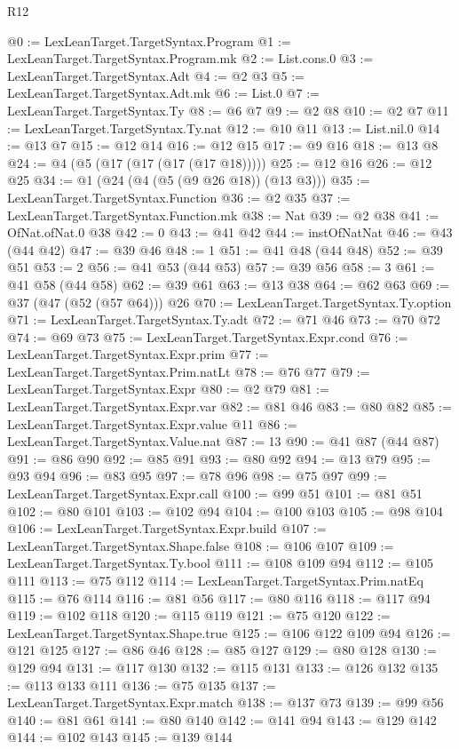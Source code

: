 \begin{lexlean}{R12}
\begin{coremodule}
@0 := LexLeanTarget.TargetSyntax.Program
@1 := LexLeanTarget.TargetSyntax.Program.mk
@2 := List.cons.{0}
@3 := LexLeanTarget.TargetSyntax.Adt
@4 := @2 @3
@5 := LexLeanTarget.TargetSyntax.Adt.mk
@6 := List.{0}
@7 := LexLeanTarget.TargetSyntax.Ty
@8 := @6 @7
@9 := @2 @8
@10 := @2 @7
@11 := LexLeanTarget.TargetSyntax.Ty.nat
@12 := @10 @11
@13 := List.nil.{0}
@14 := @13 @7
@15 := @12 @14
@16 := @12 @15
@17 := @9 @16
@18 := @13 @8
@24 := @4 (@5 (@17 (@17 (@17 (@17 @18)))))
@25 := @12 @16
@26 := @12 @25
@34 := @1 (@24 (@4 (@5 (@9 @26 @18)) (@13 @3)))
@35 := LexLeanTarget.TargetSyntax.Function
@36 := @2 @35
@37 := LexLeanTarget.TargetSyntax.Function.mk
@38 := Nat
@39 := @2 @38
@41 := OfNat.ofNat.{0} @38
@42 := 0
@43 := @41 @42
@44 := instOfNatNat
@46 := @43 (@44 @42)
@47 := @39 @46
@48 := 1
@51 := @41 @48 (@44 @48)
@52 := @39 @51
@53 := 2
@56 := @41 @53 (@44 @53)
@57 := @39 @56
@58 := 3
@61 := @41 @58 (@44 @58)
@62 := @39 @61
@63 := @13 @38
@64 := @62 @63
@69 := @37 (@47 (@52 (@57 @64))) @26
@70 := LexLeanTarget.TargetSyntax.Ty.option
@71 := LexLeanTarget.TargetSyntax.Ty.adt
@72 := @71 @46
@73 := @70 @72
@74 := @69 @73
@75 := LexLeanTarget.TargetSyntax.Expr.cond
@76 := LexLeanTarget.TargetSyntax.Expr.prim
@77 := LexLeanTarget.TargetSyntax.Prim.natLt
@78 := @76 @77
@79 := LexLeanTarget.TargetSyntax.Expr
@80 := @2 @79
@81 := LexLeanTarget.TargetSyntax.Expr.var
@82 := @81 @46
@83 := @80 @82
@85 := LexLeanTarget.TargetSyntax.Expr.value @11
@86 := LexLeanTarget.TargetSyntax.Value.nat
@87 := 13
@90 := @41 @87 (@44 @87)
@91 := @86 @90
@92 := @85 @91
@93 := @80 @92
@94 := @13 @79
@95 := @93 @94
@96 := @83 @95
@97 := @78 @96
@98 := @75 @97
@99 := LexLeanTarget.TargetSyntax.Expr.call
@100 := @99 @51
@101 := @81 @51
@102 := @80 @101
@103 := @102 @94
@104 := @100 @103
@105 := @98 @104
@106 := LexLeanTarget.TargetSyntax.Expr.build
@107 := LexLeanTarget.TargetSyntax.Shape.false
@108 := @106 @107
@109 := LexLeanTarget.TargetSyntax.Ty.bool
@111 := @108 @109 @94
@112 := @105 @111
@113 := @75 @112
@114 := LexLeanTarget.TargetSyntax.Prim.natEq
@115 := @76 @114
@116 := @81 @56
@117 := @80 @116
@118 := @117 @94
@119 := @102 @118
@120 := @115 @119
@121 := @75 @120
@122 := LexLeanTarget.TargetSyntax.Shape.true
@125 := @106 @122 @109 @94
@126 := @121 @125
@127 := @86 @46
@128 := @85 @127
@129 := @80 @128
@130 := @129 @94
@131 := @117 @130
@132 := @115 @131
@133 := @126 @132
@135 := @113 @133 @111
@136 := @75 @135
@137 := LexLeanTarget.TargetSyntax.Expr.match
@138 := @137 @73
@139 := @99 @56
@140 := @81 @61
@141 := @80 @140
@142 := @141 @94
@143 := @129 @142
@144 := @102 @143
@145 := @139 @144

\end{coremodule}
\end{lexlean}
